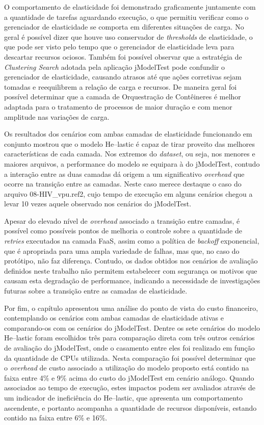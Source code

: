 \documentclass[english,brazilian]{UNISINOSmonografia} %
\begin{document}
O comportamento de elasticidade foi demonstrado graficamente juntamente com a quantidade de tarefas aguardando execução, o que permitiu verificar como o gerenciador de elasticidade se comporta em diferentes situações de carga.
%
No geral é possível dizer que houve uso conservador de \textit{thresholds} de elasticidade, o que pode ser visto pelo tempo que o gerenciador de elasticidade leva para descartar recursos ociosos.
%
Também foi possível observar que a estratégia de \textit{Clustering Search} adotada pela aplicação jModelTest pode confundir o gerenciador de elasticidade, causando atrasos até que ações corretivas sejam tomadas e reequilibrem a relação de carga e recursos.
%
De maneira geral foi possível determinar que a camada de Orquestração de Contêineres é melhor adaptada para o tratamento de processos de maior duração e com menor amplitude nas variações de carga.



Os resultados dos cenários com ambas camadas de elasticidade funcionando em conjunto mostrou que o modelo \textsf{He}--lastic é capaz de tirar proveito das melhores características de cada camada.
%
Nos extremos do \textit{dataset}, ou seja, nos menores e maiores arquivos, a performance do modelo se equipara à do jModelTest, contudo a interação entre as duas camadas dá origem a um significativo \textit{overhead} que ocorre na transição entre as camadas.
%
Neste caso merece destaque o caso do arquivo 08-HIV\_vpu.ref2, cujo tempo de execução em alguns cenários chegou a levar 10 vezes aquele observado nos cenários do jModelTest.


Apesar do elevado nível de \textit{overhead} associado a transição entre camadas, é possível como possíveis pontos de melhoria o controle sobre a quantidade de \textit{retries} executados na camada FaaS, assim como a política de \textit{backoff} exponencial, que é apropriada para uma ampla variedade de falhas, mas que, no caso do protótipo, não faz diferença.
%
Contudo, os dados obtidos nos cenários de avaliação definidos neste trabalho não permitem estabelecer com segurança os motivos que causam esta degradação de performance, indicando a necessidade de investigações futuras sobre a transição entre as camadas de elasticidade.



Por fim, o capítulo apresentou uma análise do ponto de vista do custo financeiro, contemplando os cenários com ambas camadas de elasticidade ativas e comparando-os com os cenários do jModelTest.
%
Dentre os sete cenários do modelo \textsf{He}--lastic foram escolhidos três para comparação direta com três outros cenários de avaliação do jModelTest, onde o casamento entre eles foi realizado em função da quantidade de CPUs utilizada.
%
Nesta comparação foi possível determinar que o \textit{overhead} de custo associado a utilização do modelo proposto está contido na faixa entre 4\% e 9\% acima do custo do jModelTest em cenário análogo.
%
Quando associados ao tempo de execução, estes impactos podem ser avaliados através de um indicador de ineficiência do \textsf{He}--lastic, que apresenta um comportamento ascendente, e portanto acompanha a quantidade de recursos disponíveis, estando contido na faixa entre 6\% e 16\%.
\end{document}
